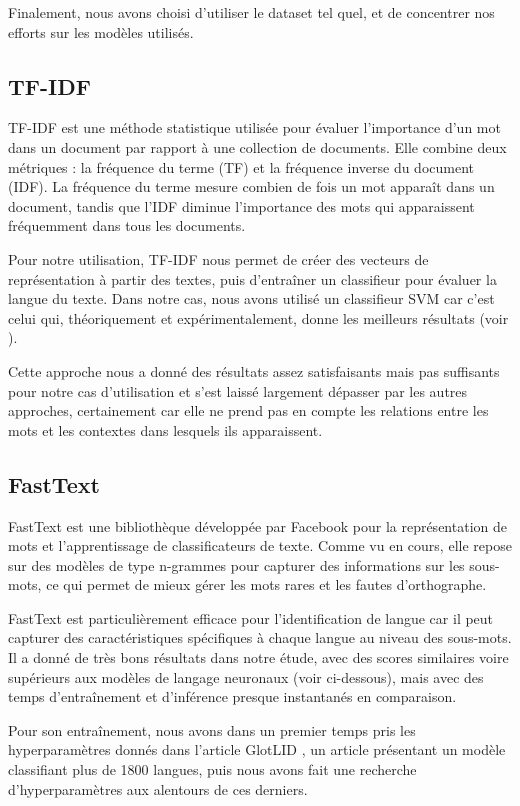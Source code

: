 Finalement, nous avons choisi d'utiliser le dataset tel quel, et de concentrer nos efforts sur les modèles utilisés.
\subsection{TF-IDF}

TF-IDF est une méthode statistique utilisée pour évaluer l'importance d'un mot dans un document par rapport à une collection de documents. Elle combine deux métriques : la fréquence du terme (TF) et la fréquence inverse du document (IDF). La fréquence du terme mesure combien de fois un mot apparaît dans un document, tandis que l'IDF diminue l'importance des mots qui apparaissent fréquemment dans tous les documents.

Pour notre utilisation, TF-IDF nous permet de créer des vecteurs de représentation à partir des textes, puis d'entraîner un classifieur pour évaluer la langue du texte. Dans notre cas, nous avons utilisé un classifieur SVM car c'est celui qui, théoriquement et expérimentalement, donne les meilleurs résultats (voir \cite{baldwin2010language}).

Cette approche nous a donné des résultats assez satisfaisants mais pas suffisants pour notre cas d'utilisation et s'est laissé largement dépasser par les autres approches, certainement car elle ne prend pas en compte les relations entre les mots et les contextes dans lesquels ils apparaissent.

\subsection{FastText}

FastText est une bibliothèque développée par Facebook \cite{joulin2017bag} pour la représentation de mots et l'apprentissage de classificateurs de texte. Comme vu en cours, elle repose sur des modèles de type n-grammes pour capturer des informations sur les sous-mots, ce qui permet de mieux gérer les mots rares et les fautes d'orthographe.

FastText est particulièrement efficace pour l'identification de langue car il peut capturer des caractéristiques spécifiques à chaque langue au niveau des sous-mots. Il a donné de très bons résultats dans notre étude, avec des scores similaires voire supérieurs aux modèles de langage neuronaux (voir ci-dessous), mais avec des temps d'entraînement et d'inférence presque instantanés en comparaison.

Pour son entraînement, nous avons dans un premier temps pris les hyperparamètres donnés dans l'article GlotLID \cite{Kargaran_2023}, un article présentant un modèle classifiant plus de 1800 langues, puis nous avons fait une recherche d'hyperparamètres aux alentours de ces derniers. 

